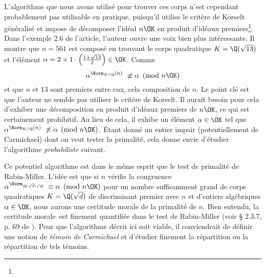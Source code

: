 L'algorithme que nous avons utilisé pour trouver ces corps n'est cependant probablement pas utilisable en pratique, puisqu'il utilise le critère de Korselt généralisé et impose de décomposer l'idéal $n\OK$ en produit d'idéaux premiers\footnote{}. Dans l'exemple 2.6 de l'article, l'auteur ouvre une voix bien plus intéressante. Il montre que $n = 561$ est composé en trouvant le corps quadratique $K = \Q(\sqrt{13})$ et l'élément $\alpha = 2 + 1\cdot \left(\frac{1 + \sqrt{13}}{2}\right) \in \OK$. Comme $$\alpha^{\Norm_{K/\Q}(n)} \not \equiv \alpha \pmod{n\OK}$$ et que $n$ et $13$ sont premiers entre eux, cela composition de $n$. Le point clé est que l'auteur ne semble pas utiliser le critère de Korselt. Il aurait besoin pour cela d'exhiber une décomposition en produit d'idéaux premiers de $n\OK$, ce qui est certainement prohibitif. Au lieu de cela, il exhibe un élément $\alpha\in \OK$ tel que $\alpha^{\Norm_{K/\Q}(n)} \not \equiv \alpha \pmod{n\OK}$. Étant donné un entier impair (potentiellement de Carmichael) dont on veut tester la primalité, cela donne envie d'étudier l'algorithme \emph{probabiliste} suivant.

\vspace{1em}
\begin{algorithm}[H]
\end{algorithm}
\vspace{1em}

Ce potentiel algorithme est dans le même esprit que le test de primalité de Rabin-Miller. L'idée est que si $n$ vérifie la congruence $\alpha^{\Norm_{\Q(\sqrt{d})/\Q}} \equiv \alpha \pmod{n\OK}$ pour un nombre suffisamment grand de corps quadratiques $K = \Q(\sqrt{d})$ de discriminant premier avec $n$ et d'entiers algébriques $\alpha \in \OK$, nous aurons une certitude morale de la primalité de $n$. Bien entendu, la \og certitude morale \fg est finement quantifiée dans le test de Rabin-Miller (voir § 2.3.7, p. 69 de \cite{Demazure}). Pour que l'algorithme décrit ici soit viable, il conviendrait de définir une notion de \emph{témoin de Carmichael} et d'étudier finement la répartition ou la répartition de tels témoins. \\


